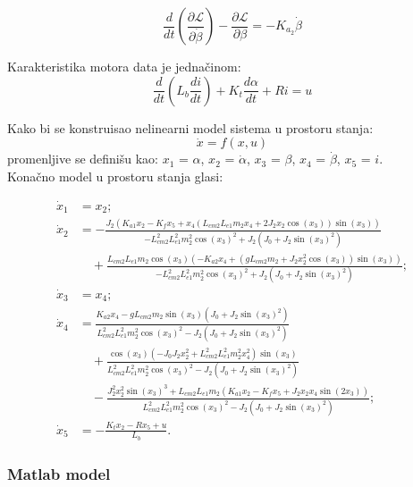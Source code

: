 \documentclass[a4paper,11pt]{article}
\theoremstyle{definition} \newtheorem{deff}{Definicija}[section]
\theoremstyle{definition} \newtheorem{prim}[deff]{Primer}
\theoremstyle{plain} \newtheorem{teor}[deff]{Teorema}
\begin{document}
	\begin{equation}
		\frac{d}{dt} \left( \frac{\partial \mathcal{L}}{\partial \dot\beta} \right) - \frac{\partial \mathcal{L}}{\partial \beta} = -K_{a_2} \dot\beta
	\end{equation}
	
	Karakteristika motora data je jednačinom: 
	\begin{equation}
		\frac{d}{dt} \left( L_b \frac{di}{dt} \right) + K_t \frac{d\alpha}{dt} + R i = u
	\end{equation}
	
	Kako bi se konstruisao nelinearni model sistema u prostoru stanja: 
	\begin{equation}
		\dot x = f(x, u)
	\end{equation}
	promenljive se definišu kao: $x_1$ = $\alpha$, $x_2$ = $\dot\alpha$,  $x_3$ = $\beta$, $x_4$ = $\dot\beta$, $x_5$ = $i$. \\
	
	
	Konačno model u prostoru stanja glasi:
	
	\begin{equation}
		\begin{aligned}
			\dot{x}_1 &= x_2; \\[0.8em]
			\dot{x}_2 &= -\frac{J_2(K_{a1}x_2 - K_fx_5 + x_4(L_{cm2}L_{e1}m_2x_4 + 2J_2x_2\cos(x_3))\sin(x_3))}{-L_{cm2}^2L_{e1}^2m_2^2\cos(x_3)^2 + J_2(J_0 + J_2\sin(x_3)^2)} \\[0.8em]
			&\quad + \frac{L_{cm2}L_{e1}m_2\cos(x_3)(-K_{a2}x_4 + (gL_{cm2}m_2 + J_2x_2^2\cos(x_3))\sin(x_3))}{-L_{cm2}^2L_{e1}^2m_2^2\cos(x_3)^2 + J_2(J_0 + J_2\sin(x_3)^2)}; \\[0.8em]
			\dot{x}_3 &= x_4; \\[0.5em]
			\dot{x}_4 &= \frac{K_{a2}x_4 - gL_{cm2}m_2\sin(x_3)(J_0 + J_2\sin(x_3)^2)}{L_{cm2}^2L_{e1}^2m_2^2\cos(x_3)^2 - J_2(J_0 + J_2\sin(x_3)^2)} \\[0.8em]
			&\quad + \frac{\cos(x_3)(-J_0J_2x_2^2 + L_{cm2}^2L_{e1}^2m_2^2x_4^2)\sin(x_3)}{L_{cm2}^2L_{e1}^2m_2^2\cos(x_3)^2 - J_2(J_0 + J_2\sin(x_3)^2)} \\[0.8em]
			&\quad - \frac{J_2^2x_2^2\sin(x_3)^3 + L_{cm2}L_{e1}m_2(K_{a1}x_2 - K_fx_5 + J_2x_2x_4\sin(2x_3))}{L_{cm2}^2L_{e1}^2m_2^2\cos(x_3)^2 - J_2(J_0 + J_2\sin(x_3)^2)};\\[0.5em]
			\dot{x}_5 &= -\frac{K_tx_2 - Rx_5 + u}{L_b}.
		\end{aligned}
		\label{eq:nonModel}
	\end{equation}
	
	
	\subsubsection{Matlab model}
	
\end{document}
